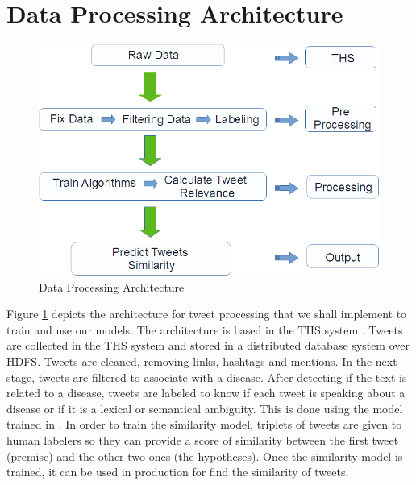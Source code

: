 \documentclass[12pt]{report}
\begin{document}
\section{Data Processing Architecture}

\begin{figure}[H]	
	\centering
	\includegraphics[width=150mm, scale = 1]{images/5_data_processing.png}	
	\caption{Data Processing Architecture}	
	\label{figure:data_processing}
\end{figure}
Figure \ref{figure:data_processing} depicts the architecture for 
tweet processing that we shall implement to train and use our models. The architecture is based in the THS system \cite{8029348, 8622504}.
Tweets are collected in  the \ac{THS} system and stored in a distributed database system  over \ac{HDFS}. Tweets are cleaned, removing links, hashtags and mentions.  
In the next stage, tweets are filtered to associate with a disease. After detecting if the text is related to a disease, tweets are labeled to know if each tweet is speaking about a disease or if it is a lexical or semantical ambiguity. This is done using the model trained in \cite{8622504}. 
In order to train the similarity model, triplets of tweets are given to human labelers so they can provide a score of similarity between the 
first tweet (premise) and the other two ones (the hypotheses). 
Once the similarity model is trained, it can be used in production for find the similarity of tweets. 
\end{document}
